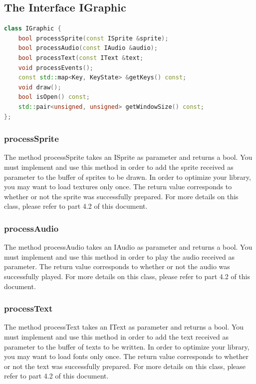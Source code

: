 \documentclass[12pt]{article}
\begin{document}
\subsection{The Interface IGraphic}
\begin{lstlisting}[language=c++]
class IGraphic {
	bool processSprite(const ISprite &sprite);
	bool processAudio(const IAudio &audio);
	bool processText(const IText &text;
	void processEvents();
	const std::map<Key, KeyState> &getKeys() const;
	void draw();
	bool isOpen() const;
	std::pair<unsigned, unsigned> getWindowSize() const;
};
\end{lstlisting}
\newpage
\subsubsection{processSprite}
The method processSprite takes an ISprite as parameter and returns a bool.\newline
You must implement and use this method in order to add the sprite received as parameter to the buffer of sprites to be drawn.\newline
In order to optimize your library, you may want to load textures only once.\newline
The return value corresponds to whether or not the sprite was successfully prepared. \newline
For more details on this class, please refer to part 4.2 of this document.\newline
\subsubsection{processAudio}
The method processAudio takes an IAudio as parameter and returns a bool.\newline
You must implement and use this method in order to play the audio received as parameter.\newline
The return value corresponds to whether or not the audio was successfully played.\newline
For more details on this class, please refer to part 4.2 of this document.\newline
\subsubsection{processText}
The method processText takes an IText as parameter and returns a bool.\newline
You must implement and use this method in order to add the text received as parameter to the buffer of texts to be written.\newline
In order to optimize your library, you may want to load fonts only once.\newline
The return value corresponds to whether or not the text was successfully prepared.\newline
For more details on this class, please refer to part 4.2 of this document.\newline
\end{document}

